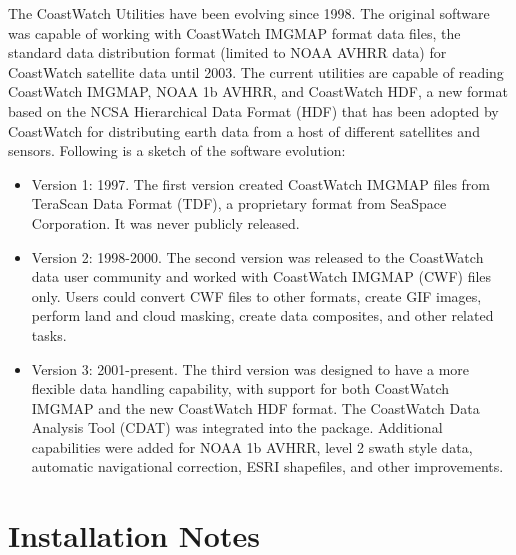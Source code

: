 The CoastWatch Utilities have been evolving since 1998.  The original
software was capable of working with CoastWatch IMGMAP format data
files, the standard data distribution format (limited to NOAA AVHRR
data) for CoastWatch satellite data until 2003.  The current utilities
are capable of reading CoastWatch IMGMAP, NOAA 1b AVHRR, and
CoastWatch HDF, a new format based on the NCSA Hierarchical Data
Format (HDF) that has been adopted by CoastWatch for distributing
earth data from a host of different satellites and sensors.  Following
is a sketch of the software evolution:
\begin{itemize}

  \item Version 1: 1997.  The first version created CoastWatch IMGMAP
  files from TeraScan Data Format (TDF), a proprietary format from
  SeaSpace Corporation.  It was never publicly released.

  \item Version 2: 1998-2000.  The second version was released to the
  CoastWatch data user community and worked with CoastWatch IMGMAP
  (CWF) files only.  Users could convert CWF files to other formats,
  create GIF images, perform land and cloud masking, create data
  composites, and other related tasks.  

  \item Version 3: 2001-present.  The third version was designed to have
  a more flexible data handling capability, with support for both
  CoastWatch IMGMAP and the new CoastWatch HDF format.  The CoastWatch
  Data Analysis Tool (CDAT) was integrated into the package.
  Additional capabilities were added for NOAA 1b AVHRR, level 2 swath
  style data, automatic navigational correction, ESRI shapefiles, and
  other improvements.

\end{itemize}

\section{Installation Notes}





